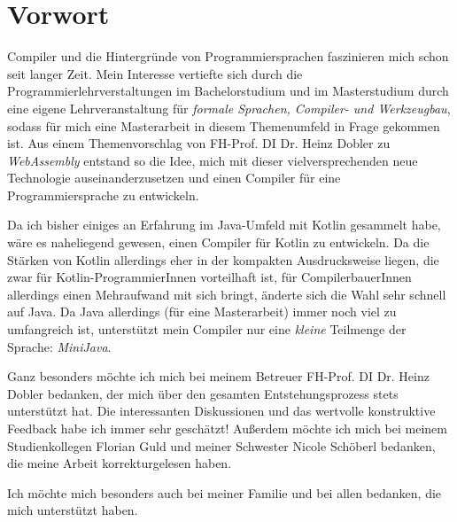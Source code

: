 \chapter{Vorwort}
 
Compiler und die Hintergründe von Programmiersprachen faszinieren mich schon seit langer Zeit. Mein Interesse vertiefte sich durch die Programmierlehrverstaltungen im Bachelorstudium und im Masterstudium durch eine eigene Lehrveranstaltung für \emph{formale Sprachen, Compiler- und Werkzeugbau}, sodass für mich eine Masterarbeit in diesem Themenumfeld in Frage gekommen ist. Aus einem Themenvorschlag von  FH-Prof. DI Dr. Heinz Dobler zu \emph{WebAssembly} entstand so die Idee, mich mit dieser vielversprechenden neue Technologie auseinanderzusetzen und einen Compiler für eine Programmiersprache zu entwickeln.

Da ich bisher einiges an Erfahrung im Java-Umfeld mit Kotlin gesammelt habe, wäre es naheliegend gewesen, einen Compiler für Kotlin zu entwickeln. Da die Stärken von Kotlin allerdings eher in der kompakten Ausdrucksweise liegen, die zwar für Kotlin-ProgrammierInnen vorteilhaft ist, für CompilerbauerInnen allerdings einen Mehraufwand mit sich bringt, änderte sich die Wahl sehr schnell auf Java. Da Java allerdings (für eine Masterarbeit) immer noch viel zu umfangreich ist, unterstützt mein Compiler nur eine \emph{kleine} Teilmenge der Sprache: \emph{MiniJava}.

Ganz besonders möchte ich mich bei meinem Betreuer FH-Prof. DI Dr. Heinz Dobler bedanken, der mich über den gesamten Entstehungsprozess stets unterstützt hat. Die interessanten Diskussionen und das wertvolle konstruktive Feedback habe ich immer sehr geschätzt! Außerdem möchte ich mich bei meinem Studienkollegen Florian Guld und meiner Schwester Nicole Schöberl bedanken, die meine Arbeit korrekturgelesen haben.

Ich möchte mich besonders auch bei meiner Familie und bei allen bedanken, die mich unterstützt haben.

